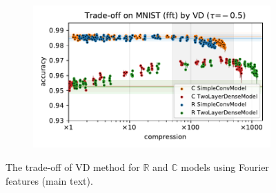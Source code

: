 \documentclass[a4paper]{extarticle}
\newcommand{\real}{\mathbb{R}}
\newcommand{\cplx}{\mathbb{C}}
\begin{document}
\begin{figure}[ht]
\begin{subfigure}[b]{0.5\textwidth}
  \end{subfigure}%
  \begin{subfigure}[b]{0.5\textwidth}
    \centering
    \includegraphics[width=\linewidth]{../figure__mnist-like__trade-off/legacy__VD__mnist__fft__-0.5.pdf}
  \end{subfigure}
  \caption{%
    The trade-off of VD method for $\real$ and $\cplx$ models using Fourier features (main text).
  }
  \label{fig:paper__mnist-like__trade-off__VD__fft}
\end{figure}
\end{document}
